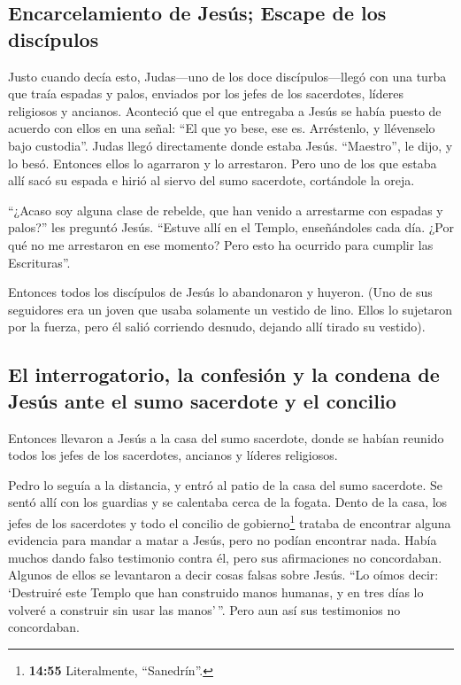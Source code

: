 \hypertarget{encarcelamiento-de-jesuxfas-escape-de-los-discuxedpulos}{%
\subsection{Encarcelamiento de Jesús; Escape de los
discípulos}\label{encarcelamiento-de-jesuxfas-escape-de-los-discuxedpulos}}

 Justo cuando decía esto, Judas---uno de los doce
discípulos---llegó con una turba que traía espadas y palos, enviados por
los jefes de los sacerdotes, líderes religiosos y ancianos.
 Aconteció que el que entregaba a Jesús se había puesto
de acuerdo con ellos en una señal: ``El que yo bese, ese es. Arréstenlo,
y llévenselo bajo custodia''.  Judas llegó directamente
donde estaba Jesús. ``Maestro'', le dijo, y lo besó. 
Entonces ellos lo agarraron y lo arrestaron.  Pero uno de
los que estaba allí sacó su espada e hirió al siervo del sumo sacerdote,
cortándole la oreja.

 ``¿Acaso soy alguna clase de rebelde, que han venido a
arrestarme con espadas y palos?'' les preguntó Jesús. 
``Estuve allí en el Templo, enseñándoles cada día. ¿Por qué no me
arrestaron en ese momento? Pero esto ha ocurrido para cumplir las
Escrituras''.

 Entonces todos los discípulos de Jesús lo abandonaron y
huyeron.  (Uno de sus seguidores era un joven que usaba
solamente un vestido de lino.  Ellos lo sujetaron por la
fuerza, pero él salió corriendo desnudo, dejando allí tirado su
vestido).

\hypertarget{el-interrogatorio-la-confesiuxf3n-y-la-condena-de-jesuxfas-ante-el-sumo-sacerdote-y-el-concilio}{%
\subsection{El interrogatorio, la confesión y la condena de Jesús ante
el sumo sacerdote y el
concilio}\label{el-interrogatorio-la-confesiuxf3n-y-la-condena-de-jesuxfas-ante-el-sumo-sacerdote-y-el-concilio}}

 Entonces llevaron a Jesús a la casa del sumo sacerdote,
donde se habían reunido todos los jefes de los sacerdotes, ancianos y
líderes religiosos.

 Pedro lo seguía a la distancia, y entró al patio de la
casa del sumo sacerdote. Se sentó allí con los guardias y se calentaba
cerca de la fogata.  Dento de la casa, los jefes de los
sacerdotes y todo el concilio de gobierno\footnote{\textbf{14:55}
  Literalmente, ``Sanedrín''.} trataba de encontrar alguna evidencia
para mandar a matar a Jesús, pero no podían encontrar nada.
 Había muchos dando falso testimonio contra él, pero sus
afirmaciones no concordaban.  Algunos de ellos se
levantaron a decir cosas falsas sobre Jesús.  ``Lo oímos
decir: `Destruiré este Templo que han construido manos humanas, y en
tres días lo volveré a construir sin usar las manos'\,''.
 Pero aun así sus testimonios no concordaban.

